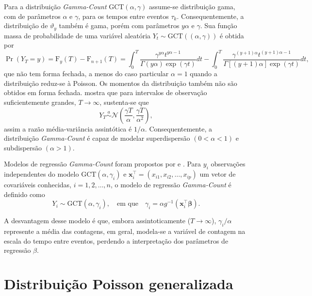 \documentclass[
    oldfontcommands,
    11pt,
    openright,
    twoside,
    a4paper,
    english,
    brazil
]{abntex2}\usepackage[]{graphicx}\usepackage[]{color}
\begin{document}
Para a distribuição \textit{Gamma-Count} GCT$(\alpha, \gamma)$ assume-se
distribuição gama, com de parâmetros $\alpha$ e $\gamma$, para os tempos
entre eventos $\tau_k$. Consequentemente, a distribuição de
$\vartheta_y$ também é gama, porém com parâmetros $y\alpha$ e
$\gamma$. Sua função massa de probabilidade de uma variável aleatória
$Y_t \sim \text{GCT}((\alpha, \gamma))$ é obtida por
\begin{equation}
  \label{eqn:pmf-gammacount}
  \Pr(Y_T = y) = \text{F}_y(T) - \text{F}_{n+1}(T) =
  \int_0^T \frac{\gamma^{y\alpha} t^{y\alpha - 1}}{\Gamma(y\alpha)
    \exp(\gamma t)} dt -
  \int_0^T \frac{\gamma^{(y+1)\alpha} t^{(y+1)\alpha - 1}}{
    \Gamma[(y+1)\alpha] \exp(\gamma t)} dt,
\end{equation}
que não tem forma fechada, a menos do caso particular $\alpha=1$ quando
a distribuição reduz-se à Poisson. Os momentos da distribuição também
não são obtidos em forma fechada. \citet{Winkelmann1995} mostra que
para intervalos de observação suficientemente grandes, $T\to\infty$,
sustenta-se que
$$ Y_T \overset{a}{\sim} \mathcal{N}\left (
  \frac{\gamma T}{\alpha}, \frac{\gamma T}{\alpha^2} \right ), $$
assim a razão média-variância assintótica é
$1/\alpha$. Consequentemente, a distribuição \textit{Gamma-Count} é
capaz de modelar superdispersão $(0 < \alpha < 1)$ e subdispersão
$(\alpha > 1)$.

Modelos de regressão \textit{Gamma-Count} foram propostos por
\citet{Winkelmann1995} e \citet{Zeviani2014}.  Para $y_i$
observações independentes do modelo $\text{GCT}(\alpha, \gamma_i)$ e
$\bm{x}_i^\top = (x_{i1}, x_{i2}, \ldots, x_{ip})$ um vetor de
covariáveis conhecidas, $i=1,2,\ldots,n$, o modelo de regressão
\textit{Gamma-Count} é definido como
$$
Y_i \sim \text{GCT}(\alpha, \gamma_i), \quad \text{em que} \quad
  \gamma_i = \alpha g^{-1}(\bm{x}_i^\top\bm{\beta}).
$$

A desvantagem desse modelo é que, embora assintoticamente
($T\to \infty$), $\gamma_i / \alpha$ represente a média das contagens,
em geral, modela-se a variável de contagem na escala do tempo entre
eventos, perdendo a interpretação dos parâmetros de regressão $\beta$.

\section{Distribuição Poisson generalizada}
\label{sec:poisson-generalizada}
\end{document}
